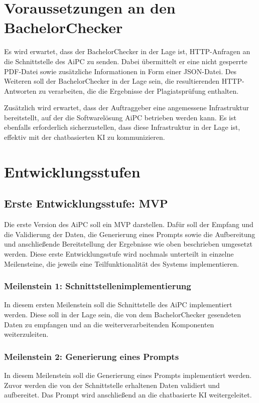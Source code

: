 \section{Voraussetzungen an den BachelorChecker}\label{sec:voraussetzungen-an-den-bachelorchecker}

Es wird erwartet, dass der BachelorChecker in der Lage ist, \ac{HTTP}-Anfragen an die Schnittstelle des \ac{AiPC} zu senden.
Dabei übermittelt er eine nicht gesperrte \ac{PDF}-Datei sowie zusätzliche Informationen in Form einer \ac{JSON}-Datei.
Des Weiteren soll der BachelorChecker in der Lage sein, die resultierenden \ac{HTTP}-Antworten zu verarbeiten, die die Ergebnisse der Plagiatsprüfung enthalten.

Zusätzlich wird erwartet, dass der Auftraggeber eine angemessene Infrastruktur bereitstellt, auf der die Softwarelösung \ac{AiPC} betrieben werden kann.
Es ist ebenfalls erforderlich sicherzustellen, dass diese Infrastruktur in der Lage ist, effektiv mit der chatbasierten \ac{KI} zu kommunizieren.

\section{Entwicklungsstufen}\label{sec:entwicklungsstufen}

\subsection{Erste Entwicklungsstufe: MVP}

Die erste Version des \ac{AiPC} soll ein \ac{MVP} darstellen.
Dafür soll der Empfang und die Validierung der Daten, die Generierung eines Prompts sowie die Aufbereitung und anschließende Bereitstellung der Ergebnisse wie oben beschrieben umgesetzt werden.
Diese erste Entwicklungsstufe wird nochmals unterteilt in einzelne Meilensteine, die jeweils eine Teilfunktionalität des Systems implementieren.

\subsubsection{Meilenstein 1: Schnittstellenimplementierung}
In diesem ersten Meilenstein soll die Schnittstelle des \ac{AiPC} implementiert werden.
Diese soll in der Lage sein, die von dem BachelorChecker gesendeten Daten zu empfangen und an die weiterverarbeitenden Komponenten weiterzuleiten.

\subsubsection{Meilenstein 2: Generierung eines Prompts}
In diesem Meilenstein soll die Generierung eines Prompts implementiert werden.
Zuvor werden die von der Schnittstelle erhaltenen Daten validiert und aufbereitet.
Das Prompt wird anschließend an die chatbasierte \ac{KI} weitergeleitet.

